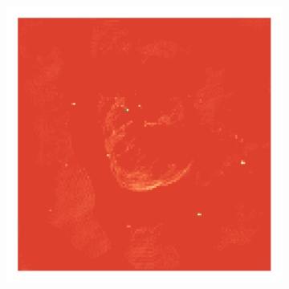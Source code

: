 \begin{figure}[h]
\begin{subfigure}[b]{0.24\linewidth}
	\end{subfigure}
	\begin{subfigure}[b]{0.24\linewidth}
		\includegraphics[width=\linewidth, trim={18px 19px 18px 18px}, clip]{./chapters/05.results/g55/L1_model.png}
	\end{subfigure}
	

\end{figure}

